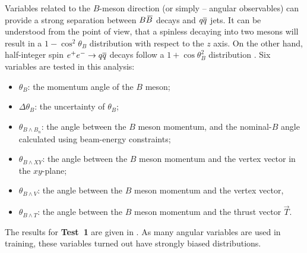 Variables related to the $B$-meson direction (or simply -- angular observables) can provide a strong separation between $B\kern 0.18em\overline{\kern -0.18em B}{}$ decays and $q\overline q$ jets.
It can be understood from the point of view, that a spinless \FourS decaying into two \B mesons will result in a $1-\cos^2\theta_B$ distribution with respect to the $z$ axis.
On the other hand, half-integer spin $e^+e^-\rightarrow q\overline q$ decays follow a $1+\cos\theta_B^2$ distribution \cite{BaBar:2014omp}.
Six variables are tested in this analysis:
\begin{itemize}
    \item $\theta_B$: the momentum angle of the $B$ meson;
    \item $\Delta\theta_B$: the uncertainty of $\theta_B$;
    \item $\theta_{B\wedge B_n}$: the angle between the $B$ meson momentum, and the nominal-$B$ angle calculated using beam-energy constraints;
    \item $\theta_{B\wedge XY}$: the angle between the $B$ meson momentum and the vertex vector in the $xy$-plane;
    \item $\theta_{B\wedge V}$: the angle between the $B$ meson momentum and the vertex vector,
    \item $\theta_{B\wedge T}$: the angle between the $B$ meson momentum and the thrust vector $\vec{T}$.
\end{itemize}
The results for \textbf{Test~1} are given in .
As many angular variables are used in \FEI training, these variables turned out have strongly biased \Mbc distributions.

